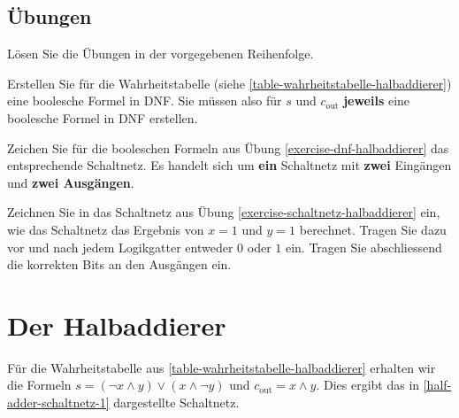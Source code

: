 \subsection{Übungen}

Lösen Sie die Übungen in der vorgegebenen Reihenfolge.

\begin{exercise}
\label{exercise-dnf-halbaddierer}
Erstellen Sie für die Wahrheitstabelle (siehe \autoref{table-wahrheitstabelle-halbaddierer}) eine boolesche Formel in \ac{DNF}. Sie müssen also für $s$ und $c_{\text{out}}$ \textbf{jeweils} eine boolesche Formel in \ac{DNF} erstellen.

\fillwithgrid{1in}
\end{exercise}

\begin{exercise}
\label{exercise-schaltnetz-halbaddierer}
Zeichen Sie für die booleschen Formeln aus Übung \ref{exercise-dnf-halbaddierer} das entsprechende Schaltnetz. Es handelt sich um \textbf{ein} Schaltnetz mit \textbf{zwei} Eingängen und \textbf{zwei Ausgängen}.

\fillwithgrid{2in}

\end{exercise}

\begin{exercise}
Zeichnen Sie in das Schaltnetz aus Übung \ref{exercise-schaltnetz-halbaddierer} ein, wie das Schaltnetz das Ergebnis von $x = 1$ und $y = 1$ berechnet. Tragen Sie dazu vor und nach jedem Logikgatter entweder $0$ oder $1$ ein. Tragen Sie abschliessend die korrekten Bits an den Ausgängen ein.
\end{exercise}

\newpage

\section{Der Halbaddierer}

Für die Wahrheitstabelle aus \autoref{table-wahrheitstabelle-halbaddierer} erhalten wir die Formeln $s = (\neg x \wedge y) \vee (x \wedge \neg y)$ und $c_{\text{out}} = x \wedge y$. Dies ergibt das in \autoref{half-adder-schaltnetz-1} dargestellte Schaltnetz.

